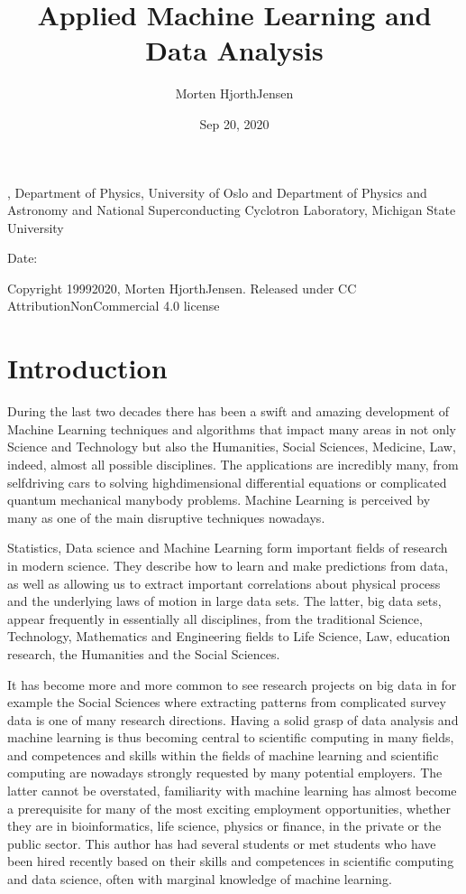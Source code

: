 \documentclass[letterpaper,10pt,english]{sphinxmanual}
\title{Applied Machine Learning and Data Analysis}
\date{Sep 20, 2020}
\author{Morten Hjorth\sphinxhyphen{}Jensen}
\begin{document}
\pagestyle{empty}
\sphinxmaketitle
\pagestyle{plain}
\sphinxtableofcontents
\pagestyle{normal}
\label{\detokenize{chapter1::doc}}








, Department of Physics, University of Oslo and Department of Physics and Astronomy and National Superconducting Cyclotron Laboratory, Michigan State University

Date: 

Copyright 1999\sphinxhyphen{}2020, Morten Hjorth\sphinxhyphen{}Jensen. Released under CC Attribution\sphinxhyphen{}NonCommercial 4.0 license


\chapter{Introduction}
\label{\detokenize{chapter1:introduction}}
During the last two decades there has been a swift and amazing
development of Machine Learning techniques and algorithms that impact
many areas in not only Science and Technology but also the Humanities,
Social Sciences, Medicine, Law, indeed, almost all possible
disciplines. The applications are incredibly many, from self\sphinxhyphen{}driving
cars to solving high\sphinxhyphen{}dimensional differential equations or complicated
quantum mechanical many\sphinxhyphen{}body problems. Machine Learning is perceived
by many as one of the main disruptive techniques nowadays.

Statistics, Data science and Machine Learning form important
fields of research in modern science.  They describe how to learn and
make predictions from data, as well as allowing us to extract
important correlations about physical process and the underlying laws
of motion in large data sets. The latter, big data sets, appear
frequently in essentially all disciplines, from the traditional
Science, Technology, Mathematics and Engineering fields to Life
Science, Law, education research, the Humanities and the Social
Sciences.

It has become more
and more common to see research projects on big data in for example
the Social Sciences where extracting patterns from complicated survey
data is one of many research directions.  Having a solid grasp of data
analysis and machine learning is thus becoming central to scientific
computing in many fields, and competences and skills within the fields
of machine learning and scientific computing are nowadays strongly
requested by many potential employers. The latter cannot be
overstated, familiarity with machine learning has almost become a
prerequisite for many of the most exciting employment opportunities,
whether they are in bioinformatics, life science, physics or finance,
in the private or the public sector. This author has had several
students or met students who have been hired recently based on their
skills and competences in scientific computing and data science, often
with marginal knowledge of machine learning.
\end{document}
